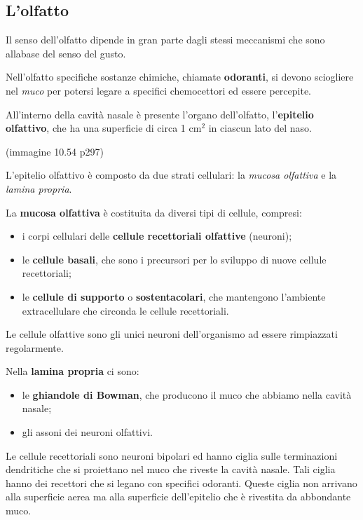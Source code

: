 \documentclass[]{article}
\begin{document}
\subsection{L'olfatto}\label{lolfatto}

Il senso dell'olfatto dipende in gran parte dagli stessi meccanismi che
sono allabase del senso del gusto.

Nell'olfatto specifiche sostanze chimiche, chiamate \textbf{odoranti},
si devono sciogliere nel \emph{muco} per potersi legare a specifici
chemocettori ed essere percepite.

All'interno della cavità nasale è presente l'organo dell'olfatto,
l'\textbf{epitelio olfattivo}, che ha una superficie di circa 1 cm\(^2\)
in ciascun lato del naso.

(immagine 10.54 p297)

L'epitelio olfattivo è composto da due strati cellulari: la \emph{mucosa
olfattiva} e la \emph{lamina propria}.

La \textbf{mucosa olfattiva} è costituita da diversi tipi di cellule,
compresi:

\begin{itemize}
\itemsep1pt\parskip0pt
\item
  i corpi cellulari delle \textbf{cellule recettoriali olfattive}
  (neuroni);
\item
  le \textbf{cellule basali}, che sono i precursori per lo sviluppo di
  nuove cellule recettoriali;
\item
  le \textbf{cellule di supporto} o \textbf{sostentacolari}, che
  mantengono l'ambiente extracellulare che circonda le cellule
  recettoriali.
\end{itemize}

Le cellule olfattive sono gli unici neuroni dell'organismo ad essere
rimpiazzati regolarmente.

Nella \textbf{lamina propria} ci sono:

\begin{itemize}
\itemsep1pt\parskip0pt
\item
  le \textbf{ghiandole di Bowman}, che producono il muco che abbiamo
  nella cavità nasale;
\item
  gli assoni dei neuroni olfattivi.
\end{itemize}

Le cellule recettoriali sono neuroni bipolari ed hanno ciglia sulle
terminazioni dendritiche che si proiettano nel muco che riveste la
cavità nasale. Tali ciglia hanno dei recettori che si legano con
specifici odoranti. Queste ciglia non arrivano alla superficie aerea ma
alla superficie dell'epitelio che è rivestita da abbondante muco.
\end{document}
